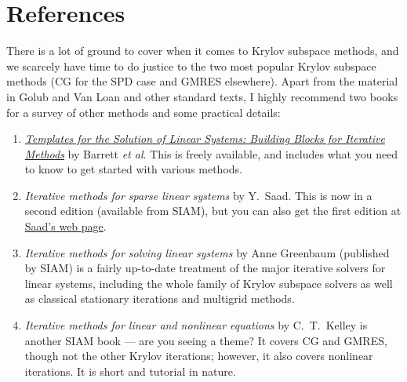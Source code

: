 \section{References}

There is a lot of ground to cover when it comes to Krylov subspace
methods, and we scarcely have time to do justice to the two most popular
Krylov subspace methods (CG for the SPD case and GMRES elsewhere).
Apart from the material in Golub and Van Loan and other standard texts,
I highly recommend two books for a survey of other methods and some
practical details:
\begin{enumerate}
\item \href{http://www.netlib.org/templates/templates.pdf}{\em Templates for the Solution of Linear Systems:
Building Blocks for Iterative Methods}
  by Barrett {\em et al}.  This is freely available, and includes
  what you need to know to get started with various methods.
\item {\em Iterative methods for sparse linear systems} by Y.~Saad.
  This is now in a second edition (available from SIAM), but you
  can also get the first edition at \href{http://www-users.cs.umn.edu/~saad/books.html}{Saad's web page}.
\item {\em Iterative methods for solving linear systems} by Anne Greenbaum
  (published by SIAM) is a fairly up-to-date treatment of the major iterative
  solvers for linear systems, including the whole family of Krylov subspace
  solvers as well as classical stationary iterations and multigrid methods.
\item {\em Iterative methods for linear and nonlinear equations} by C.~T.~Kelley
  is another SIAM book --- are you seeing a theme?
  It covers CG and GMRES, though not the other
  Krylov iterations; however, it also covers nonlinear iterations.  It is
  short and tutorial in nature.
\end{enumerate}
